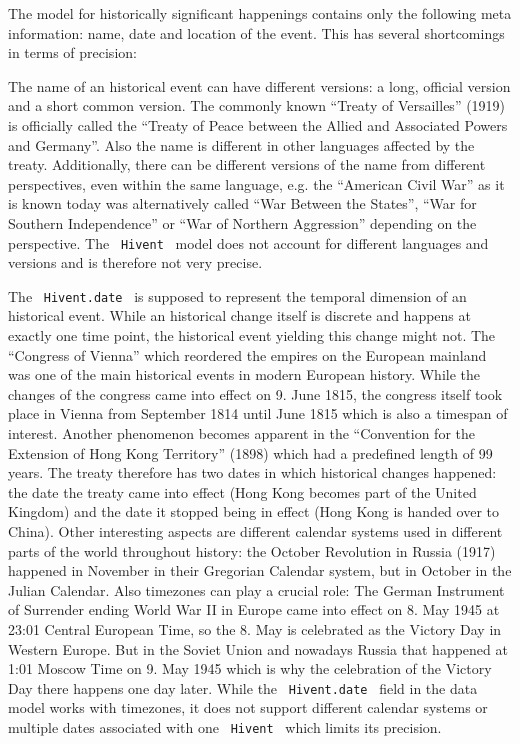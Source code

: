The model for historically significant happenings contains only the following meta information: name, date and location of the event. This has several shortcomings in terms of precision:

The name of an historical event can have different versions: a long, official version and a short common version. The commonly known ``Treaty of Versailles'' (1919) is officially called the ``Treaty of Peace between the Allied and Associated Powers and Germany''. Also the name is different in other languages affected by the treaty. Additionally, there can be different versions of the name from different perspectives, even within the same language, e.g. the ``American Civil War'' as it is known today was alternatively called ``War Between the States'', ``War for Southern Independence'' or ``War of Northern Aggression'' depending on the perspective.
The ~\texttt{Hivent}~ model does not account for different languages and versions and is therefore not very precise.

The ~\texttt{Hivent.date}~ is supposed to represent the temporal dimension of an historical event. While an historical change itself is discrete and happens at exactly one time point, the historical event yielding this change might not. The ``Congress of Vienna'' which reordered the empires on the European mainland was one of the main historical events in modern European history. While the changes of the congress came into effect on 9. June 1815, the congress itself took place in Vienna from September 1814 until June 1815 which is also a timespan of interest. Another phenomenon becomes apparent in the ``Convention for the Extension of Hong Kong Territory'' (1898) which had a predefined length of 99 years. The treaty therefore has two dates in which historical changes happened: the date the treaty came into effect (Hong Kong becomes part of the United Kingdom) and the date it stopped being in effect (Hong Kong is handed over to China). Other interesting aspects are different calendar systems used in different parts of the world throughout history: the October Revolution in Russia (1917) happened in November in their Gregorian Calendar system, but in October in the Julian Calendar. Also timezones can play a crucial role: The German Instrument of Surrender ending World War II in Europe came into effect on 8. May 1945 at 23:01 Central European Time, so the 8. May is celebrated as the Victory Day in Western Europe. But in the Soviet Union and nowadays Russia that happened at 1:01 Moscow Time on 9. May 1945 which is why the celebration of the Victory Day there happens one day later. While the ~\texttt{Hivent.date}~ field in the data model works with timezones, it does not support different calendar systems or multiple dates associated with one ~\texttt{Hivent}~ which limits its precision.

